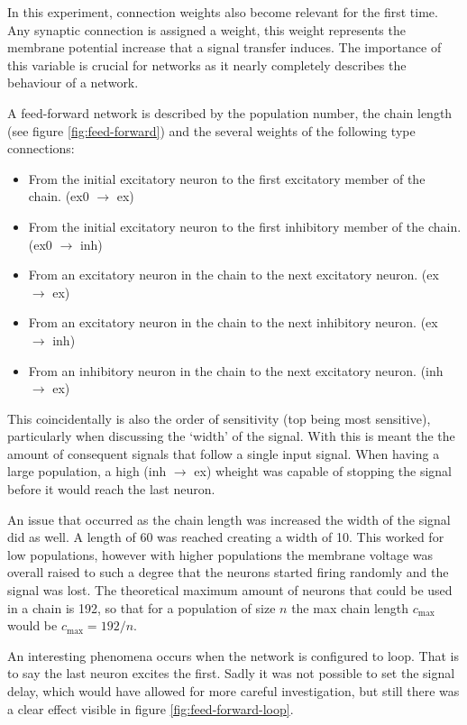\documentclass[a4paper,twocolumn]{article}
\begin{document}
In this experiment, connection weights also become relevant for the first time.
Any synaptic connection is assigned a weight, this weight represents the
membrane potential increase that a signal transfer induces. The importance of
this variable is crucial for networks as it nearly completely describes the
behaviour of a network.

A feed-forward network is described by the population number, the chain length
(see figure \ref{fig:feed-forward}) and the several weights of the following
type connections:
\begin{itemize}
    \item From the initial excitatory neuron to the first excitatory member of the
        chain. (ex0 $\rightarrow$ ex)
    \item From the initial excitatory neuron to the first inhibitory member of the
        chain. (ex0 $\rightarrow$ inh)
    \item From an excitatory neuron in the chain to the next excitatory neuron.
        (ex $\rightarrow$ ex)
    \item From an excitatory neuron in the chain to the next inhibitory neuron.
        (ex $\rightarrow$ inh)
    \item From an inhibitory neuron in the chain to the next excitatory neuron.
        (inh $\rightarrow$ ex)
\end{itemize}
This coincidentally is also the order of sensitivity (top being most sensitive),
particularly when discussing the `width' of the signal. With this is meant the
the amount of consequent signals that follow a single input signal. When having
a large population, a high (inh $\rightarrow$ ex) wheight was capable of
stopping the signal before it would reach the last neuron.

An issue that occurred as the chain length was increased the width of the signal
did as well. A length of 60 was reached creating a width of 10. This worked for
low populations, however with higher populations the membrane voltage was
overall raised to such a degree that the neurons started firing randomly and the
signal was lost. The theoretical maximum amount of neurons that could be used in
a chain is 192, so that for a population of size $n$ the max chain length
$c_\text{max}$ would be $c_\text{max} = 192 / n$.

An interesting phenomena occurs when the network is configured to loop. That is
to say the last neuron excites the first. Sadly it was not possible to set the
signal delay, which would have allowed for more careful investigation, but still
there was a clear effect visible in figure \ref{fig:feed-forward-loop}.
\end{document}
